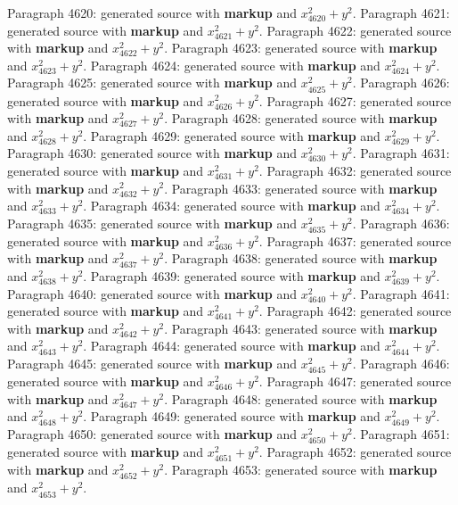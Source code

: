 \documentclass{article}
\begin{document}
Paragraph 4620: generated source with \textbf{markup} and $x_{4620}^2 + y^2$.
Paragraph 4621: generated source with \textbf{markup} and $x_{4621}^2 + y^2$.
Paragraph 4622: generated source with \textbf{markup} and $x_{4622}^2 + y^2$.
Paragraph 4623: generated source with \textbf{markup} and $x_{4623}^2 + y^2$.
Paragraph 4624: generated source with \textbf{markup} and $x_{4624}^2 + y^2$.
Paragraph 4625: generated source with \textbf{markup} and $x_{4625}^2 + y^2$.
Paragraph 4626: generated source with \textbf{markup} and $x_{4626}^2 + y^2$.
Paragraph 4627: generated source with \textbf{markup} and $x_{4627}^2 + y^2$.
Paragraph 4628: generated source with \textbf{markup} and $x_{4628}^2 + y^2$.
Paragraph 4629: generated source with \textbf{markup} and $x_{4629}^2 + y^2$.
Paragraph 4630: generated source with \textbf{markup} and $x_{4630}^2 + y^2$.
Paragraph 4631: generated source with \textbf{markup} and $x_{4631}^2 + y^2$.
Paragraph 4632: generated source with \textbf{markup} and $x_{4632}^2 + y^2$.
Paragraph 4633: generated source with \textbf{markup} and $x_{4633}^2 + y^2$.
Paragraph 4634: generated source with \textbf{markup} and $x_{4634}^2 + y^2$.
Paragraph 4635: generated source with \textbf{markup} and $x_{4635}^2 + y^2$.
Paragraph 4636: generated source with \textbf{markup} and $x_{4636}^2 + y^2$.
Paragraph 4637: generated source with \textbf{markup} and $x_{4637}^2 + y^2$.
Paragraph 4638: generated source with \textbf{markup} and $x_{4638}^2 + y^2$.
Paragraph 4639: generated source with \textbf{markup} and $x_{4639}^2 + y^2$.
Paragraph 4640: generated source with \textbf{markup} and $x_{4640}^2 + y^2$.
Paragraph 4641: generated source with \textbf{markup} and $x_{4641}^2 + y^2$.
Paragraph 4642: generated source with \textbf{markup} and $x_{4642}^2 + y^2$.
Paragraph 4643: generated source with \textbf{markup} and $x_{4643}^2 + y^2$.
Paragraph 4644: generated source with \textbf{markup} and $x_{4644}^2 + y^2$.
Paragraph 4645: generated source with \textbf{markup} and $x_{4645}^2 + y^2$.
Paragraph 4646: generated source with \textbf{markup} and $x_{4646}^2 + y^2$.
Paragraph 4647: generated source with \textbf{markup} and $x_{4647}^2 + y^2$.
Paragraph 4648: generated source with \textbf{markup} and $x_{4648}^2 + y^2$.
Paragraph 4649: generated source with \textbf{markup} and $x_{4649}^2 + y^2$.
Paragraph 4650: generated source with \textbf{markup} and $x_{4650}^2 + y^2$.
Paragraph 4651: generated source with \textbf{markup} and $x_{4651}^2 + y^2$.
Paragraph 4652: generated source with \textbf{markup} and $x_{4652}^2 + y^2$.
Paragraph 4653: generated source with \textbf{markup} and $x_{4653}^2 + y^2$.
\end{document}
